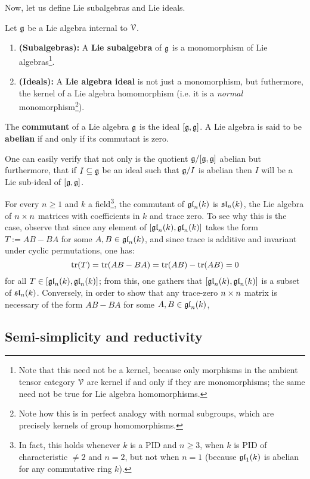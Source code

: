         Now, let us define Lie subalgebras and Lie ideals. 
        \begin{definition} \label{def: lie_subalgebras_and_lie_ideals}
            Let $\g$ be a Lie algebra internal to $\calV$. 
                \begin{enumerate}
                    \item \textbf{(Subalgebras):} A \textbf{Lie subalgebra} of $\g$ is a monomorphism of Lie algebras\footnote{Note that this need not be a kernel, because only  morphisms in the ambient tensor category $\calV$ are kernel if and only if they are monomorphisms; the same need not be true for Lie algebra homomorphisms.}.
                    \item \textbf{(Ideals):} A \textbf{Lie algebra ideal} is not just a monomorphism, but futhermore, the kernel of a Lie algebra homomorphism (i.e. it is a \textit{normal} monomorphism\footnote{Note how this is in perfect analogy with normal subgroups, which are precisely kernels of group homomorphisms.}). 
                \end{enumerate}
        \end{definition}
        \begin{definition}[Commutants] \label{def: commutants}
            The \textbf{commutant} of a Lie algebra $\g$ is the ideal $[\g, \g]$. A Lie algebra is said to be \textbf{abelian} if and only if its commutant is zero.
        \end{definition}
        \begin{remark}
            One can easily verify that not only is the quotient $\g/[\g, \g]$ abelian but furthermore, that if $I \subseteq \g$ be an ideal such that $\g/I$ is abelian then $I$ will be a Lie sub-ideal of $[\g, \g]$. 
        \end{remark}
        \begin{example}
            For every $n \geq 1$ and $k$ a field\footnote{In fact, this holds whenever $k$ is a PID and $n \geq 3$, when $k$ is PID of characteristic $\not = 2$ and $n = 2$, but not when $n = 1$ (because $\gl_1(k)$ is abelian for any commutative ring $k$).}, the commutant of $\gl_n(k)$ is $\sl_n(k)$, the Lie algebra of $n \x n$ matrices with coefficients in $k$ and trace zero. To see why this is the case, observe that since any element of $[\gl_n(k), \gl_n(k)]$ takes the form $T := AB - BA$ for some $A, B \in \gl_n(k)$, and since trace is additive and invariant under cyclic permutations, one has:
                $$\trace(T) = \trace(AB - BA) = \trace(AB) - \trace(AB) = 0$$
            for all $T \in [\gl_n(k), \gl_n(k)]$; from this, one gathers that $[\gl_n(k), \gl_n(k)]$ is a subset of $\sl_n(k)$. Conversely, in order to show that any trace-zero $n \x n$ matrix is necessary of the form $AB - BA$ for some $A, B \in \gl_n(k)$, 
        \end{example}
    
    \subsection{Semi-simplicity and reductivity}